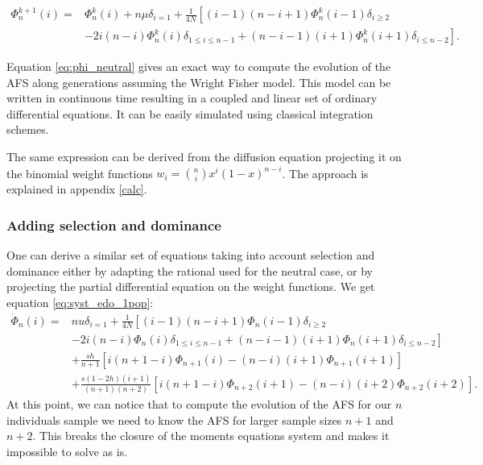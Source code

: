 \begin{equation}
\begin{split}
\Phi_n^{k+1}(i)=& \Phi_n^{k}(i) + n\mu \delta_{i=1} + \frac{1}{4 N} \left[ (i-1)(n-i+1) \Phi_n^{k}(i-1)\delta_{i\geq 2} \right.\\
		      & \left.-2i(n-i)\Phi_n^{k}(i)\delta_{1\leq i\leq n-1}  + (n-i-1)(i+1)\Phi_n^{k}(i+1)\delta_{i\leq n-2} \right].
\end{split}
\label{eq:phi_neutral}
\end{equation}

Equation \eqref{eq:phi_neutral} gives an exact way to compute the evolution of the AFS along generations assuming the Wright Fisher model. This model can be written in continuous time resulting in a coupled and linear set of ordinary differential equations. It can be easily simulated using classical integration schemes. 

The same expression can be derived from the diffusion equation projecting it on the binomial weight functions $w_i=  {n\choose i}  x^i (1-x)^{n-i}$. The approach is explained in appendix \ref{calc}.

\subsubsection{Adding selection and dominance} 
One can derive a similar set of equations taking into account selection and dominance either by adapting the rational used for the neutral case, or by projecting the partial differential equation on the weight functions. We get equation \eqref{eq:syst_edo_1pop}:
\begin{equation}
\begin{split}
\dot \Phi_n(i)=& nu  \delta_{i=1} + \frac{1}{4 N} \left[ (i-1)(n-i+1) \Phi_n(i-1)\delta_{i\geq 2} \right.\\
		      & \left.-2i(n-i)\Phi_n(i)\delta_{1\leq i\leq n-1}  + (n-i-1)(i+1)\Phi_n(i+1)\delta_{i\leq n-2} \right]\\
		      &+ \frac{sh}{n+1}\left[i(n+1-i)\Phi_{n+1}(i)-(n-i)(i+1)\Phi_{n+1}(i+1)\right] \\
		      & +\frac{s(1-2h)(i+1)}{(n+1)(n+2)}\left[i(n+1-i)\Phi_{n+2}(i+1)-(n-i)(i+2)\Phi_{n+2}(i+2)\right].
\end{split}
\label{eq:syst_edo_1pop}
\end{equation}
 At this point, we can notice that to compute the evolution of the AFS for our $n$ individuals sample we need to know the AFS for larger sample sizes $n+1$ and $n+2$. This breaks the closure of the moments equations system and makes it impossible to solve as is.

